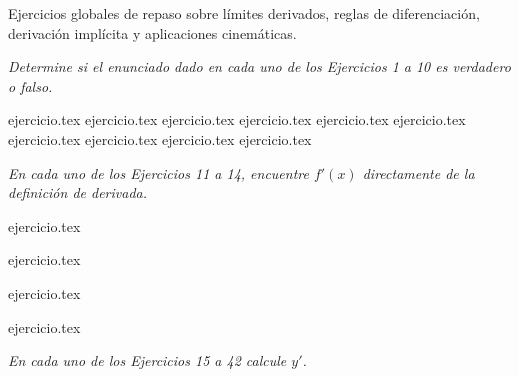 
Ejercicios globales de repaso sobre límites derivados, reglas de diferenciación, derivación implícita y aplicaciones cinemáticas.

\noindent \textit{Determine si el enunciado dado en cada uno de los Ejercicios 1 a 10 es verdadero o falso.}

\begin{enumerate}
    {ejercicio.tex}
    {ejercicio.tex}
    {ejercicio.tex}
    {ejercicio.tex}
    {ejercicio.tex}
    {ejercicio.tex}
    {ejercicio.tex}
    {ejercicio.tex}
    {ejercicio.tex}
    {ejercicio.tex}
\end{enumerate}

\noindent \textit{En cada uno de los Ejercicios 11 a 14, encuentre $f'(x)$ directamente de la definición de derivada.}

\begin{enumerate}
    \begin{minipage}{0.45\textwidth}
    \setcounter{enumi}{10}
    {ejercicio.tex}
    \addtocounter{enumi}{1}
    {ejercicio.tex}
    \end{minipage}%
    \begin{minipage}{0.45\textwidth}
    \setcounter{enumi}{11}
    {ejercicio.tex}
    \addtocounter{enumi}{1}
    {ejercicio.tex}
    \end{minipage}
\end{enumerate}

\noindent \textit{En cada uno de los Ejercicios 15 a 42 calcule $y'$.}

